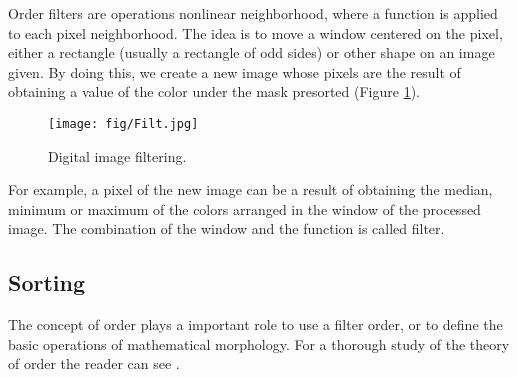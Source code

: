 Order filters are operations nonlinear neighborhood, where a function is applied to each pixel neighborhood. The idea is to move a window centered on the pixel, either a rectangle (usually a rectangle of odd sides) or other shape on an image given. By doing this, we create a new image whose pixels are the result of obtaining a value of the color under the mask presorted (Figure \ref{fig:Filt}). 


\begin{figure}[htbp]
	\centering
		\texttt{[image: fig/Filt.jpg]}
	\caption{Digital image filtering.}
	\label{fig:Filt}
\end{figure}



For example, a pixel of the new image can be a result of obtaining the median, minimum or maximum of the colors arranged in the window of the processed image.  
The combination of the window and the function is called filter. 

\subsection{Sorting}
The concept of order plays a important role to use a filter order, or to define the basic operations of mathematical morphology. For a thorough study of the theory of order the reader can see \cite {serra1993anamorphoses}.


  
